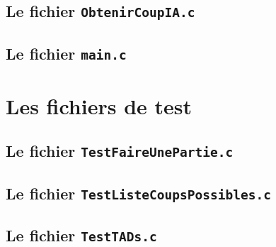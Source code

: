 \section{Le fichier \tt{ObtenirCoupIA.c}}


\section{Le fichier \tt{main.c}}


\chapter{Les fichiers de test}

\section{Le fichier \tt{TestFaireUnePartie.c}}


\section{Le fichier \tt{TestListeCoupsPossibles.c}}


\section{Le fichier \tt{TestTADs.c}}


